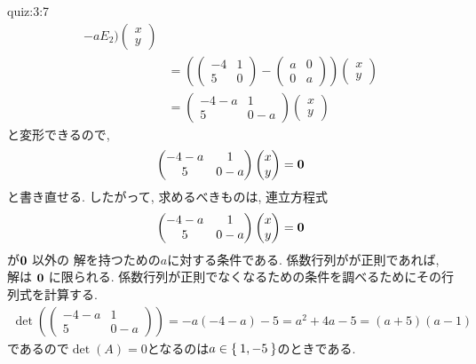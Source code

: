 \begin{answerof}{quiz:3:7}
\begin{align*}
        -
        aE_2)\begin{pmatrix}x\\y\end{pmatrix}\\
        &=
        (\begin{pmatrix}-4&1\\5&0\end{pmatrix}
        -
        \begin{pmatrix}a&0\\0&a\end{pmatrix}
          )\begin{pmatrix}x\\y\end{pmatrix}\\
        &=
        \begin{pmatrix}-4-a&1\\5&0-a\end{pmatrix}
          \begin{pmatrix}x\\y\end{pmatrix}        
  \end{align*}
  と変形できるので,
  \begin{align*}
    \begin{pmatrix}-4-a&1\\5&0-a\end{pmatrix}
    \begin{pmatrix}x\\y\end{pmatrix}
      =
      \boldsymbol{0}
  \end{align*}
  と書き直せる.
  したがって,
  求めるべきものは,
  連立方程式
  \begin{align*}
    \begin{pmatrix}-4-a&1\\5&0-a\end{pmatrix}
    \begin{pmatrix}x\\y\end{pmatrix}
      =
      \boldsymbol{0}
  \end{align*}
  が$\boldsymbol{0}$
  以外の
  解を持つための$a$に対する条件である.
  係数行列がが正則であれば,
  解は
  $\boldsymbol{0}$
  に限られる.
  係数行列が正則でなくなるための条件を調べるためにその行列式を計算する.
  \begin{align*}
    \det(\begin{pmatrix}-4-a&1\\5&0-a\end{pmatrix})
     =-a(-4-a)-5=a^2+4a-5=(a+5)(a-1)
  \end{align*}
  であるので$\det(A)=0$となるのは$a\in\Set{1,-5}$のときである.


\end{answerof}
